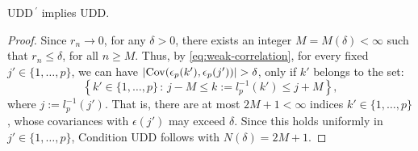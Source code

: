 \begin{proposition} \label{prop:UDD-equivalent}
UDD\,$^\prime$ implies UDD.
\end{proposition} 

\begin{proof}%


Since $r_n\to 0$, for any $\delta > 0$, there exists an integer 
$M = M(\delta)<\infty$ such that $r_n\le\delta$, for all $n\ge M$. 
Thus, by \eqref{eq:weak-correlation}, for every fixed 
$j' \in\{1,\ldots,p\}$, we can have $|{\rm {Cov}}(\epsilon_p(k'),\epsilon_p(j'))| > \delta$,
only if $k'$ belongs to the set:
$$ 
 \left\{ k' \in \{1,\dots,p\} \, :\, j-M \le  k := l_p^{-1}(k') \le j+M \right\},
$$
where $j:= l_p^{-1}(j')$. That is, there are at most $2M+1<\infty$ indices  $k'\in\{1,\dots,p\}$, whose covariances with $\epsilon(j')$ may exceed $\delta$. 
Since this holds uniformly in $j'\in\{1,\ldots,p\}$, Condition UDD follows with 
$N(\delta) = 2M+1$.
\end{proof}



